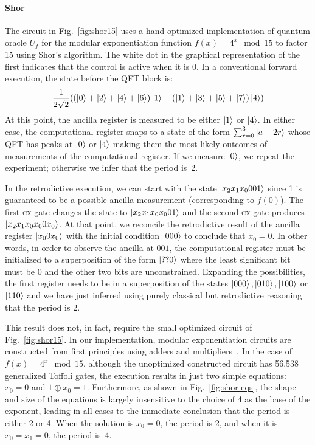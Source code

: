 \documentclass[sigplan,review]{acmart}
\newcommand{\cx}{\textsc{cx}}
\theoremstyle{definition}
\begin{document}
\paragraph*{Shor}
The circuit in Fig.~\ref{fig:shor15} uses a hand-optimized
implementation of quantum oracle $U_f$ for the modular exponentiation
function $f(x) = 4^x \mod{15}$ to factor 15 using Shor's
algorithm. The white dot in the graphical representation of the first
indicates that the control is active when it is 0. In a conventional
forward execution, the state before the QFT block is:
\[
\frac{1}{2\sqrt{2}} (
  (\ket{0} + \ket{2} + \ket{4} + \ket{6}) \ket{1} + 
  (\ket{1} + \ket{3} + \ket{5} + \ket{7}) \ket{4}
  )
\]
At this point, the ancilla register is measured to be either $\ket{1}$ or
$\ket{4}$. In either case, the computational register snaps to a state
of the form $\sum_{r=0}^3 \ket{a+2r}$ whose QFT has peaks at $\ket{0}$
or $\ket{4}$ making them the most likely outcomes of measurements of
the computational register. If we measure $\ket{0}$, we repeat the
experiment; otherwise we infer that the period is~2.

In the retrodictive execution, we can start with the state
$\ket{x_2x_1x_0001}$ since 1 is guaranteed to be a possible ancilla
measurement (corresponding to $f(0)$). The first \cx-gate changes the
state to $\ket{x_2x_1x_0x_001}$ and the second \cx-gate produces
$\ket{x_2x_1x_0x_00x_0}$. At that point, we reconcile the retrodictive
result of the ancilla register $\ket{x_00x_0}$ with the initial
condition $\ket{000}$ to conclude that $x_0=0$. In other words, in
order to observe the ancilla at $001$, the computational register must
be initialized to a superposition of the form $\ket{??0}$ where the
least significant bit must be 0 and the other two bits are
unconstrained. Expanding the possibilities, the first register needs
to be in a superposition of the states $\ket{000}, \ket{010},
\ket{100}$ or $\ket{110}$ and we have just inferred using purely
classical but retrodictive reasoning that the period is
2.

This result does not, in fact, require the small optimized circuit of
Fig.~\ref{fig:shor15}. In our implementation, modular exponentiation
circuits are constructed from first principles using adders and
multipliers~\cite{PhysRevA.54.147}. In the case of $f(x) = 4^x
\mod{15}$, although the unoptimized constructed circuit has 56,538
generalized Toffoli gates,
the execution results in just two simple equations: $x_0 = 0$ and $1
\oplus x_0 = 1$. Furthermore, as shown in Fig.~\ref{fig:shor-eqs}, the
shape and size of the equations is largely insensitive to the choice
of 4 as the base of the exponent, leading in all cases to the
immediate conclusion that the period is either 2 or 4. When the
solution is $x_0=0$, the period is 2, and when it is $x_0=x_1=0$, the
period is~4.
\end{document}
